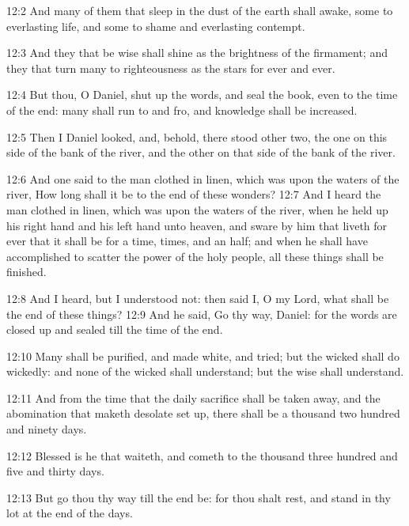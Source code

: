 12:2 And many of them that sleep in the dust of the earth shall awake, some to everlasting life, and some to shame and everlasting contempt.

12:3 And they that be wise shall shine as the brightness of the firmament; and they that turn many to righteousness as the stars for ever and ever.

12:4 But thou, O Daniel, shut up the words, and seal the book, even to the time of the end: many shall run to and fro, and knowledge shall be increased.

12:5 Then I Daniel looked, and, behold, there stood other two, the one on this side of the bank of the river, and the other on that side of the bank of the river.

12:6 And one said to the man clothed in linen, which was upon the waters of the river, How long shall it be to the end of these wonders?  12:7 And I heard the man clothed in linen, which was upon the waters of the river, when he held up his right hand and his left hand unto heaven, and sware by him that liveth for ever that it shall be for a time, times, and an half; and when he shall have accomplished to scatter the power of the holy people, all these things shall be finished.

12:8 And I heard, but I understood not: then said I, O my Lord, what shall be the end of these things?  12:9 And he said, Go thy way, Daniel: for the words are closed up and sealed till the time of the end.

12:10 Many shall be purified, and made white, and tried; but the wicked shall do wickedly: and none of the wicked shall understand; but the wise shall understand.

12:11 And from the time that the daily sacrifice shall be taken away, and the abomination that maketh desolate set up, there shall be a thousand two hundred and ninety days.

12:12 Blessed is he that waiteth, and cometh to the thousand three hundred and five and thirty days.

12:13 But go thou thy way till the end be: for thou shalt rest, and stand in thy lot at the end of the days.

